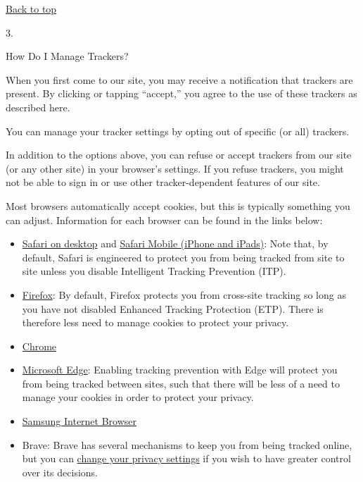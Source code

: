 \href{app}{Back to top}

3.

How Do I Manage Trackers?

When you first come to our site, you may receive a notification that
trackers are present. By clicking or tapping ``accept,'' you agree to
the use of these trackers as described here.

You can manage your tracker settings by opting out of specific (or all)
trackers.

In addition to the options above, you can refuse or accept trackers from
our site (or any other site) in your browser's settings. If you refuse
trackers, you might not be able to sign in or use other
tracker-dependent features of our site.

Most browsers automatically accept cookies, but this is typically
something you can adjust. Information for each browser can be found in
the links below:

\begin{itemize}
\item
  \href{https://support.apple.com/guide/safari/manage-cookies-and-website-data-sfri11471/mac}{Safari
  on desktop} and \href{https://support.apple.com/en-us/HT201265}{Safari
  Mobile (iPhone and iPads)}: Note that, by default, Safari is
  engineered to protect you from being tracked from site to site unless
  you disable Intelligent Tracking Prevention (ITP).
\item
  \href{https://support.mozilla.org/en-US/kb/clear-cookies-and-site-data-firefox?redirectlocale=en-US\&redirectslug=delete-cookies-remove-info-websites-stored}{Firefox}:
  By default, Firefox protects you from cross-site tracking so long as
  you have not disabled Enhanced Tracking Protection (ETP). There is
  therefore less need to manage cookies to protect your privacy.
\item
  \href{https://support.google.com/chrome/answer/95647?hl=en}{Chrome}
\item
  \href{https://support.microsoft.com/en-us/help/4468242/microsoft-edge-browsing-data-and-privacy-microsoft-privacy}{Microsoft
  Edge}: Enabling tracking prevention with Edge will protect you from
  being tracked between sites, such that there will be less of a need to
  manage your cookies in order to protect your privacy.
\item
  \href{https://aboutdevice.com/clear-cookies-history-cache-on-samsung-internet-browser-android/}{Samsung
  Internet Browser}
\item
  Brave: Brave has several mechanisms to keep you from being tracked
  online, but you can
  \href{https://support.brave.com/hc/en-us/articles/360017989132-How-do-I-change-my-Privacy-Settings-}{change
  your privacy settings} if you wish to have greater control over its
  decisions.
\end{itemize}

